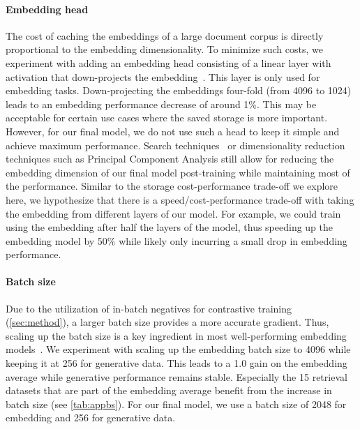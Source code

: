 \documentclass{article}
\begin{document}
\paragraph{Embedding head} The cost of caching the embeddings of a large document corpus is directly proportional to the embedding dimensionality. To minimize such costs, we experiment with adding an embedding head consisting of a linear layer with activation that down-projects the embedding~\cite{ni2021large,muennighoff2022sgpt}. This layer is only used for embedding tasks. Down-projecting the embeddings four-fold (from 4096 to 1024) leads to an embedding performance decrease of around 1\%. This may be acceptable for certain use cases where the saved storage is more important. However, for our final model, we do not use such a head to keep it simple and achieve maximum performance. Search techniques~\cite{arya1998optimal,johnson2017billionscale,douze2024faiss} or dimensionality reduction techniques such as Principal Component Analysis still allow for reducing the embedding dimension of our final model post-training while maintaining most of the performance. Similar to the storage cost-performance trade-off we explore here, we hypothesize that there is a speed/cost-performance trade-off with taking the embedding from different layers of our model. For example, we could train using the embedding after half the layers of the model, thus speeding up the embedding model by 50\% while likely only incurring a small drop in embedding performance.

\paragraph{Batch size} Due to the utilization of in-batch negatives for contrastive training (\autoref{sec:method}), a larger batch size provides a more accurate gradient. Thus, scaling up the batch size is a key ingredient in most well-performing embedding models~\cite{xiao2023cpack,wang2022text}. We experiment with scaling up the embedding batch size to 4096 while keeping it at 256 for generative data. This leads to a 1.0 gain on the embedding average while generative performance remains stable. Especially the 15 retrieval datasets that are part of the embedding average benefit from the increase in batch size (see \autoref{tab:appbs}). For our final model, we use a batch size of 2048 for embedding and 256 for generative data.
\end{document}

